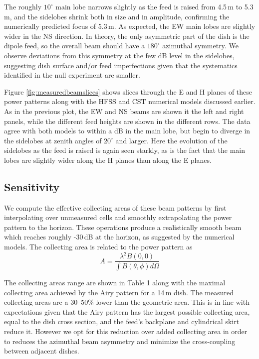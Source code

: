 \documentclass{emulateapj}
\begin{document}
The roughly $10^\circ$ main lobe narrows slightly as the feed is raised from 4.5\,m to 5.3\,m, and the sidelobes shrink both in size and in amplitude, confirming the numerically predicted focus of 5.3\,m. As expected, the EW main lobes are slightly wider in the NS direction. In theory, the only asymmetric part of the dish is the dipole feed, so the overall beam should have a $180^\circ$ azimuthal symmetry. We observe deviations from this symmetry at the few dB level in the sidelobes, suggesting dish surface and/or feed imperfections given that the systematics identified in the null experiment are smaller. 

Figure \ref{fig:measuredbeamslices} shows slices through the E and H planes of these power patterns along with the HFSS and CST numerical models discussed earlier. As in the previous plot, the EW and NS beams are shown it the left and right panels, while the different feed heights are shown in the different rows. The data agree with both models to within a dB in the main lobe, but begin to diverge in the sidelobes at zenith angles of $20^\circ$ and larger. Here the evolution of the sidelobes as the feed is raised is again seen starkly, as is the fact that the main lobes are slightly wider along the H planes than along the E planes. 

\subsection{Sensitivity}

We compute the effective collecting areas of these beam patterns by first interpolating over unmeasured cells and smoothly extrapolating the power pattern to the horizon. These operations produce a realistically smooth beam which reaches roughly -30\,dB at the horizon, as suggested by the numerical models. The collecting area is related to the power pattern as
\begin{equation}
	A=\frac{\lambda^2 B(0,0)}{\int B(\theta,\phi)d\Omega}
\end{equation}

The collecting areas range are shown in Table 1 along with the maximal collecting area achieved by the Airy pattern for a 14\,m dish. The measured collecting areas are a 30--50\% lower than the geometric area. This is in line with expectations given that the Airy pattern has the largest possible collecting area, equal to the dish cross section, and the feed's backplane and cylindrical skirt reduce it. However we opt for this reduction over added collecting area in order to reduces the azimuthal beam asymmetry and minimize the cross-coupling between adjacent dishes.
\end{document}
